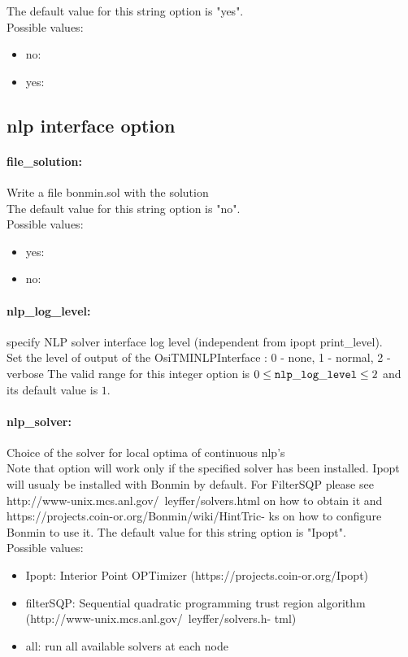 The default value for this string option is "yes".
\\ 
Possible values:
\begin{itemize}
   \item no: 
   \item yes: 
\end{itemize}

\subsection{nlp interface option}
\label{sec:nlp_interface_option}
\paragraph{file\_solution:}\label{sec:file_solution} Write a file bonmin.sol with the solution $\;$ \\

The default value for this string option is "no".
\\ 
Possible values:
\begin{itemize}
   \item yes: 
   \item no: 
\end{itemize}

\paragraph{nlp\_log\_level:}\label{sec:nlp_log_level} specify NLP solver interface log level (independent from ipopt print\_level). $\;$ \\
 Set the level of output of the OsiTMINLPInterface
: 0 - none, 1 - normal, 2 - verbose The valid range for this integer option is
$0 \le {\tt nlp\_log\_level } \le 2$
and its default value is $1$.


\paragraph{nlp\_solver:}\label{sec:nlp_solver} Choice of the solver for local optima of continuous nlp's $\;$ \\
 Note that option will work only if the specified
solver has been installed. Ipopt will usualy be
installed with Bonmin by default. For FilterSQP
please see
http://www-unix.mcs.anl.gov/~leyffer/solvers.html
on how to obtain it and
https://projects.coin-or.org/Bonmin/wiki/HintTric-
ks on how to configure Bonmin to use it.
The default value for this string option is "Ipopt".
\\ 
Possible values:
\begin{itemize}
   \item Ipopt: Interior Point OPTimizer
(https://projects.coin-or.org/Ipopt)
   \item filterSQP: Sequential quadratic programming trust region
algorithm
(http://www-unix.mcs.anl.gov/~leyffer/solvers.h-
tml)
   \item all: run all available solvers at each node
\end{itemize}


